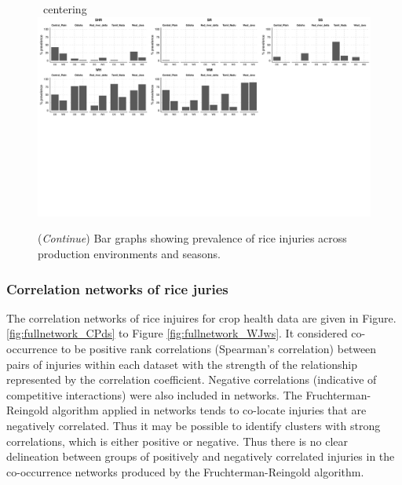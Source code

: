     
    \begin{landscape}
\begin{figure}\
centering
\includegraphics[height = 1\textwidth]{figures/barplot3/barplot3.pdf}
\caption[\textit{Continue}]{(\textit{Continue}) Bar graphs showing  prevalence of rice injuries across production environments and seasons.} 
\label{fig:barplot3} 
\end{figure}  
\end{landscape} 


\subsubsection{Correlation networks of rice juries} 

The correlation networks of rice injuires for crop health data are given in Figure. \ref{fig:fullnetwork_CPds} to Figure \ref{fig:fullnetwork_WJws}. It considered co-occurrence to be positive rank correlations (Spearman’s correlation) between pairs of injuries within each dataset with the strength of the relationship represented by the correlation coefficient. Negative correlations (indicative of competitive interactions) were also included in networks. The Fruchterman-Reingold algorithm applied in networks tends to co-locate injuries that are negatively correlated. Thus it may be possible to identify clusters with strong correlations, which is either positive or negative. Thus there is no clear delineation between groups of positively and negatively correlated injuries in the co-occurrence networks produced by the Fruchterman-Reingold algorithm.

